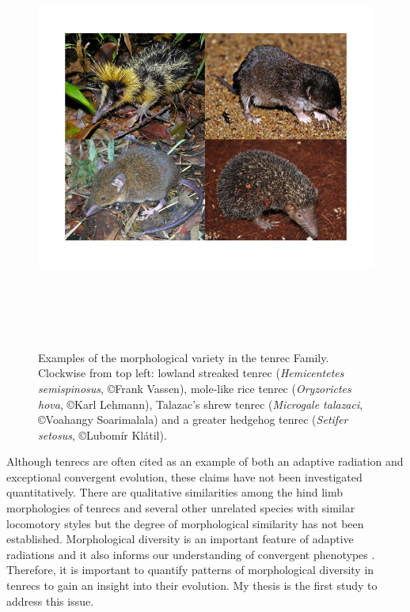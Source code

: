\begin{figure}[h] 
  \centering
  \includegraphics[width=14cm, height=14cm, keepaspectratio=true]{Introduction/FourTenrecs.jpg}
    \caption[Examples of tenrec species]
    {Examples of the morphological variety in the tenrec Family. Clockwise from top left: lowland streaked tenrec (\textit{Hemicentetes semispinosus}, \copyright Frank Vassen), mole-like rice tenrec (\textit{Oryzorictes hova}, \copyright Karl Lehmann), Talazac's shrew tenrec (\textit{Microgale talazaci}, \copyright Voahangy Soarimalala) and a greater hedgehog tenrec (\textit{Setifer setosus}, \copyright Lubom\'{i}r Kl\'{a}til).}
  \label{fig:tenrecs}
  \end{figure}
  
	Although tenrecs are often cited as an example of both an adaptive radiation and exceptional convergent evolution, these claims have not been investigated quantitatively. There are qualitative similarities among the hind limb morphologies of tenrecs and several other unrelated species with similar locomotory styles \citep{Salton2009} but the degree of morphological similarity has not been established. Morphological diversity is an important feature of adaptive radiations \citep{Losos2010a} and it also informs our understanding of convergent phenotypes \citep{Muschick2012}. Therefore, it is important to quantify patterns of morphological diversity in tenrecs to gain an insight into their evolution. My thesis is the first study to address this issue. 

